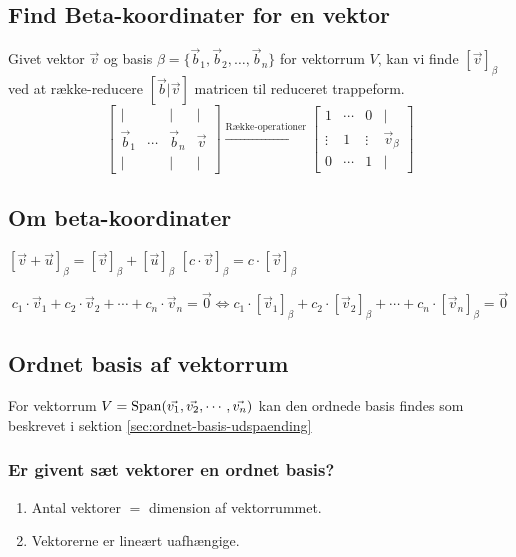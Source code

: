 \subsection{Find Beta-koordinater for en vektor}
\label{sec:beta-koordinater}
Givet vektor $\vec{v}$ og basis $\beta = \{\vec{b}_1, \vec{b}_2, \ldots, \vec{b}_n\}$ for vektorrum $V$, kan vi finde $[\vec{v}]_\beta$ ved at række-reducere \([\vec{b}|\vec{v}]\) matricen til reduceret trappeform.
\[
\begin{bmatrix}
    \vert & & \vert & \vert \\
    \vec{b}_1 & \cdots & \vec{b}_n & \vec{v} \\
    \vert & & \vert & \vert
\end{bmatrix}
\xrightarrow{\text{Række-operationer}}
\begin{bmatrix}
    1 & \cdots & 0 & \vert \\
    \vdots & 1 & \vdots & \vec{v}_\beta \\
    0 & \cdots & 1 & \vert
\end{bmatrix}
\]

\subsection{Om beta-koordinater}
\( [\vec{v} + \vec{u}]_\beta = [\vec{v}]_\beta + [\vec{u}]_\beta \)
\hfill
\( [c \cdot \vec{v}]_\beta = c \cdot [\vec{v}]_\beta \)

\[ c_1 \cdot \vec{v}_1 + c_2 \cdot \vec{v}_2 + \cdots + c_n \cdot \vec{v}_n = \vec{0} \iff c_1 \cdot [\vec{v}_1]_\beta + c_2 \cdot [\vec{v}_2]_\beta + \cdots + c_n \cdot [\vec{v}_n]_\beta = \vec{0} \]

\subsection{Ordnet basis af vektorrum}
For vektorrum \(V=\operatorname{Span}(\vec{v_1},\vec{v_2},\cdots,\vec{v_n})\) kan den ordnede basis findes som beskrevet i sektion \ref{sec:ordnet-basis-udspaending}

\subsubsection{Er givent sæt vektorer en ordnet basis?}
\begin{enumerate}
    \item Antal vektorer $=$ dimension af vektorrummet.
    \item Vektorerne er lineært uafhængige.
\end{enumerate}

